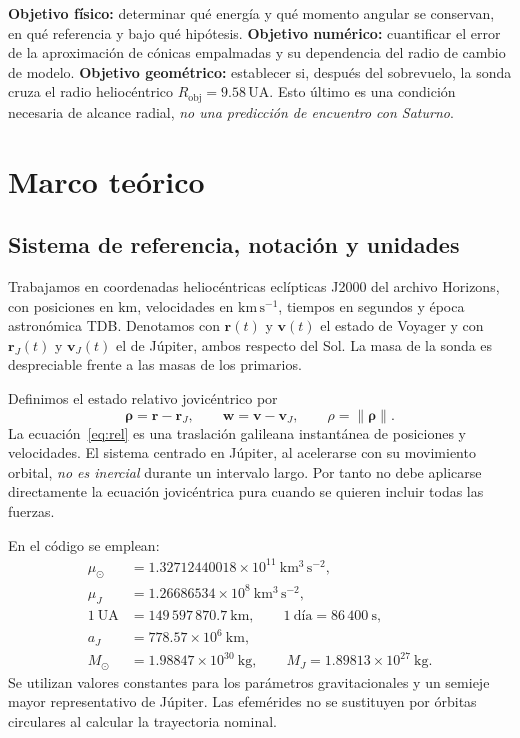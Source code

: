 \documentclass[11pt,a4paper]{article}
\newcommand{\vect}[1]{\bm{#1}}
\newcommand{\muS}{\mu_\odot}
\newcommand{\muJ}{\mu_{J}}
\newcommand{\rJ}{\vect r_{J}}
\newcommand{\vJ}{\vect v_{J}}
\newcommand{\rV}{\vect r}
\newcommand{\vV}{\vect v}
\begin{document}
\textbf{Objetivo físico:} determinar qué energía y qué momento angular se conservan, en qué referencia y bajo qué hipótesis. \textbf{Objetivo numérico:} cuantificar el error de la aproximación de cónicas empalmadas y su dependencia del radio de cambio de modelo. \textbf{Objetivo geométrico:} establecer si, después del sobrevuelo, la sonda cruza el radio heliocéntrico $R_{\mathrm{obj}}=9.58\,\mathrm{UA}$. Esto último es una condición necesaria de alcance radial, \emph{no una predicción de encuentro con Saturno}.

\section{Marco teórico}
\subsection{Sistema de referencia, notación y unidades}
Trabajamos en coordenadas heliocéntricas eclípticas J2000 del archivo Horizons, con posiciones en $\mathrm{km}$, velocidades en $\mathrm{km\,s^{-1}}$, tiempos en segundos y época astronómica TDB. Denotamos con $\rV(t)$ y $\vV(t)$ el estado de Voyager y con $\rJ(t)$ y $\vJ(t)$ el de Júpiter, ambos respecto del Sol. La masa de la sonda es despreciable frente a las masas de los primarios.

Definimos el estado relativo jovicéntrico por
\begin{equation}\label{eq:rel}
\vect\rho=\rV-\rJ,\qquad \vect w=\vV-\vJ,
\qquad \rho=\lVert\vect\rho\rVert.
\end{equation}
La ecuación~\eqref{eq:rel} es una traslación galileana instantánea de posiciones y velocidades. El sistema centrado en Júpiter, al acelerarse con su movimiento orbital, \emph{no es inercial} durante un intervalo largo. Por tanto no debe aplicarse directamente la ecuación jovicéntrica pura cuando se quieren incluir todas las fuerzas.

En el código se emplean:
\begin{align*}
\muS &= 1.32712440018\times 10^{11}\ \mathrm{km^3\,s^{-2}},\\
\muJ &= 1.26686534\times 10^{8}\ \mathrm{km^3\,s^{-2}},\\
1\ \mathrm{UA}&=149\,597\,870.7\ \mathrm{km},\qquad 1\ \mathrm{día}=86\,400\ \mathrm{s},\\
a_J&=778.57\times10^6\ \mathrm{km},\\
M_\odot &= 1.98847\times10^{30}\ \mathrm{kg},\qquad M_J=1.89813\times10^{27}\ \mathrm{kg}.
\end{align*}
Se utilizan valores constantes para los parámetros gravitacionales y un semieje mayor representativo de Júpiter. Las efemérides no se sustituyen por órbitas circulares al calcular la trayectoria nominal.
\end{document}
